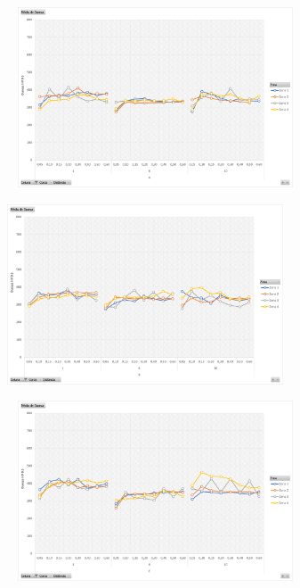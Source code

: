 \begin{figure}[htb]
    \centering
    \begin{subfigure}{.4\textwidth}\
        \centering
        \includegraphics[width = 0.9\textwidth]{Figures/Cap4/Grafico_4_Zonas_Y.png}
        \caption{}
        \label{fig:resultados_Tampa_Y_dent}
    \end{subfigure}%
    \begin{subfigure}{.4\textwidth}
        \centering
        \includegraphics[width = 0.9\textwidth]{Figures/Cap4/Grafico_4_Zonas_O.png}
        \caption{}
        \label{fig:resultados_Tampa_O_dent}
    \end{subfigure}
    \begin{subfigure}{.4\textwidth}\
        \centering
        \includegraphics[width = 0.9\textwidth]{Figures/Cap4/Grafico_4_Zonas_P.png}

\end{subfigure}
\end{figure}

